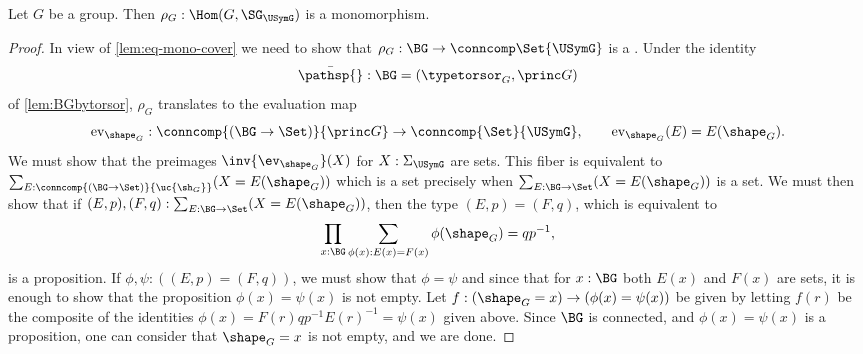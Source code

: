 \begin{theorem}[Cayley]
  \label{lem:allgpsarepermutationgps}
  Let $G$ be a group. Then
  $\rho_G:\Hom(G,\SG_{\USymG})  $ is a monomorphism.
\end{theorem}
\begin{proof}
  In view of \cref{lem:eq-mono-cover} we need to show that $\rho_G:\BG\to \conncomp \Set {\USymG}$ is a
  \covering.
  Under the identity
  $$\bar{\pathsp{}}:\BG=(\typetorsor_G,\princ G)$$ of
  \cref{lem:BGbytorsor}, $\rho_G$ translates to the
  evaluation map
  $$\mathrm{ev}_{\shape_G}:\conncomp{(\BG\to\Set)}{\princ G}\to\conncomp{\Set}{\USymG},\qquad
  \mathrm{ev}_{\shape_G}(E)=E(\shape_G).$$
  We must show that the preimages
  $\inv{\ev_{\shape_G}}(X)$ for $X:\Sigma_{\USymG}$ are sets.  This
  fiber is equivalent to
  $\sum_{E:\conncomp{(\BG\to\Set)}{\uc{\sh_G}}}(X=E(\shape_G))$ which is a
  set precisely when $\sum_{E:\BG\to\Set}(X=E(\shape_G))$ is a set.  We
  must then show that if $(E,p),(F,q):\sum_{E:\BG\to\Set}(X=E(\shape_G))$,
  then the type $(E,p)=(F,q)$, which is equivalent
to
  $$\prod_{x:\BG}\sum_{\phi(x):E(x)=F(x)}\phi(\shape_G)=qp^{-1},$$
  is a proposition.
If $\phi,\psi:((E,p)=(F,q))$, we
  must show that $\phi=\psi$ and since that for $x:\BG$ both $E(x)$ and
  $F(x)$ are sets, it is enough to show that the proposition
  $\phi(x)=\psi(x)$ is not empty.  Let
  $f:(\shape_G=x)\to(\phi(x)=\psi(x))$ be given by letting $f(r)$ be the
  composite of the identities $\phi(x)=F(r)qp^{-1}E(r)^{-1}=\psi(x)$
  given above.  Since $\BG$ is connected, and $\phi(x)=\psi(x)$ is a
  proposition, one can consider that $\shape_G=x$ is not empty, and we
  are done.
\end{proof}

